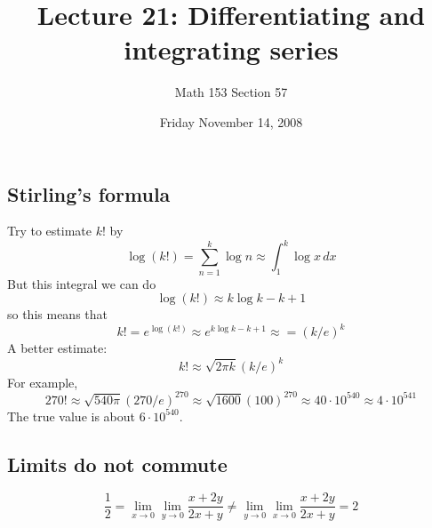 \documentclass[12pt]{article}
\title{Lecture 21: Differentiating and integrating series}
\author{Math 153 Section 57}
\date{Friday November 14, 2008}
\begin{document}
\maketitle

\subsection*{Stirling's formula}

Try to estimate $k!$ by
$$
\log (k!) = \sum_{n=1}^k \log n \approx \int_1^k \log x \, dx
$$
But this integral we can do
$$
\log (k!) \approx k \log k - k + 1
$$
so this means that
$$
k! = e^{\log (k!)} \approx e^{k \log k - k + 1} \approx = (k/e)^k
$$
A better estimate:
$$
k! \approx \sqrt{2 \pi k} (k/e)^k
$$
For example,
$$
270! \approx \sqrt{540 \pi} (270/e)^{270} \approx \sqrt{1600} (100)^{270} \approx 40 \cdot 10^{540} \approx 4 \cdot 10^{541}
$$
The true value is about $6 \cdot 10^{540}$.

\subsection*{Limits do not commute}

$$
\frac{1}{2} = \lim_{x \to 0} \lim_{y \to 0} \frac{x + 2y}{2x + y}
\neq \lim_{y \to 0} \lim_{x \to 0} \frac{x + 2y}{2x + y} = 2
$$

\subsection*{}
\end{document}
